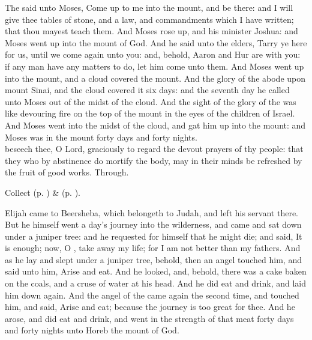  The  said unto Moses, Come up to me into the mount, and be there: and I will give thee tables of stone, and a law, and commandments which I have written; that thou mayest teach them. And Moses rose up, and his minister Joshua: and Moses went up into the mount of God. And he said unto the elders, Tarry ye here for us, until we come again unto you: and, behold, Aaron and Hur are with you: if any man have any matters to do, let him come unto them. And Moses went up into the mount, and a cloud covered the mount. And the glory of the  abode upon mount Sinai, and the cloud covered it six days: and the seventh day he called unto Moses out of the midst of the cloud. And the sight of the glory of the  was like devouring fire on the top of the mount in the eyes of the children of Israel. And Moses went into the midst of the cloud, and gat him up into the mount: and Moses was in the mount forty days and forty nights.
\\
{} beseech thee, O Lord, graciously to regard the devout prayers of thy people: that they who by abstinence do mortify the body, may in their minds be refreshed by the fruit of good works. Through.
\begin{rubric}
     Collect  (p. \pageref{AshWednesdayMassCollect}) \&   (p. \pageref{SPLivingDeparted}).
\end{rubric}

 Elijah came to Beersheba, which belongeth to Judah, and left his servant there. But he himself went a day's journey into the wilderness, and came and sat down under a juniper tree: and he requested for himself that he might die; and said, It is enough; now, O , take away my life; for I am not better than my fathers. And as he lay and slept under a juniper tree, behold, then an angel touched him, and said unto him, Arise and eat. And he looked, and, behold, there was a cake baken on the coals, and a cruse of water at his head. And he did eat and drink, and laid him down again. And the angel of the  came again the second time, and touched him, and said, Arise and eat; because the journey is too great for thee. And he arose, and did eat and drink, and went in the strength of that meat forty days and forty nights unto Horeb the mount of God.

